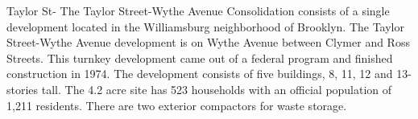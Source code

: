 Taylor St-
The Taylor Street-Wythe Avenue Consolidation consists of a single development located in the Williamsburg neighborhood of Brooklyn. The Taylor Street-Wythe Avenue development is on Wythe Avenue between Clymer and Ross Streets. This turnkey development came out of a federal program and finished construction in 1974. The development consists of five buildings, 8, 11, 12 and 13-stories tall. The 4.2 acre site has 523 households with an official population of 1,211 residents. There are two exterior compactors for waste storage.